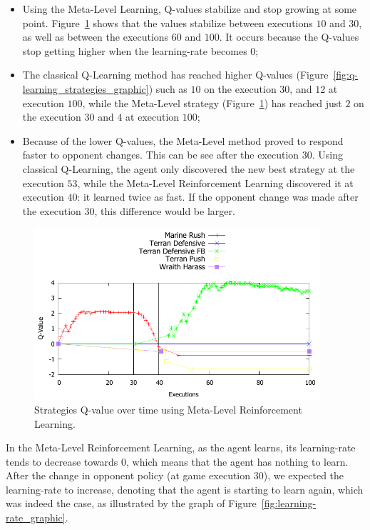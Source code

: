 \begin{itemize}
\item Using the Meta-Level Learning, Q-values stabilize and stop growing at some point. Figure~\ref{fig:meta-learning_strategies_graphic} shows that the values stabilize between executions $10$ and $30$, as well as between the executions $60$ and $100$. It occurs because the Q-values stop getting higher when the learning-rate becomes $0$;

\item The classical Q-Learning method has reached higher Q-values (Figure~\ref{fig:q-learning_strategies_graphic}) such as $10$ on the execution $30$, and $12$ at execution $100$, while the Meta-Level strategy (Figure~\ref{fig:meta-learning_strategies_graphic}) has reached just $2$ on the execution $30$ and $4$ at execution $100$;

\item Because of the lower Q-values, the Meta-Level method proved to respond faster to opponent changes. This can be see after the execution $30$. Using classical Q-Learning, the agent only discovered the new best strategy at the execution $53$, while the Meta-Level Reinforcement Learning discovered it at execution $40$: it learned twice as fast. If the opponent change was made after the execution $30$, this difference would be larger.
\end{itemize}

\begin{figure}[ht]
\centering
\includegraphics[width=400px]{images/meta-learning_strategies_graphic}
\caption{Strategies Q-value over time using Meta-Level Reinforcement Learning.}
\label{fig:meta-learning_strategies_graphic}
\end{figure}

In the Meta-Level Reinforcement Learning, as the agent learns, its learning-rate tends to decrease towards $0$, which means that the agent has nothing to learn.
After the change in opponent policy (at game execution $30$), we expected the learning-rate to increase, denoting that the agent is starting to learn again, which was indeed the case, as illustrated by the graph of Figure~\ref{fig:learning-rate_graphic}. 

